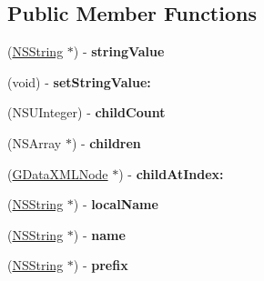 \subsection*{Public Member Functions}
\begin{DoxyCompactItemize}
\item 
\hypertarget{interface_g_data_x_m_l_node_ad6cef8a7c9c6714b8ea42e2620f86866}{
(\hyperlink{class_n_s_string}{NSString} $\ast$) -\/ {\bfseries stringValue}}
\label{interface_g_data_x_m_l_node_ad6cef8a7c9c6714b8ea42e2620f86866}

\item 
\hypertarget{interface_g_data_x_m_l_node_ab3b73dcb1ac9607325552747a3055a1e}{
(void) -\/ {\bfseries setStringValue:}}
\label{interface_g_data_x_m_l_node_ab3b73dcb1ac9607325552747a3055a1e}

\item 
\hypertarget{interface_g_data_x_m_l_node_a8c1ecef5a1827105f8cdb435fe330dda}{
(NSUInteger) -\/ {\bfseries childCount}}
\label{interface_g_data_x_m_l_node_a8c1ecef5a1827105f8cdb435fe330dda}

\item 
\hypertarget{interface_g_data_x_m_l_node_a5d78f07c8cd059176801973bf6883452}{
(NSArray $\ast$) -\/ {\bfseries children}}
\label{interface_g_data_x_m_l_node_a5d78f07c8cd059176801973bf6883452}

\item 
\hypertarget{interface_g_data_x_m_l_node_acabc5e624c3bbc27ba75c443d48b9795}{
(\hyperlink{interface_g_data_x_m_l_node}{GDataXMLNode} $\ast$) -\/ {\bfseries childAtIndex:}}
\label{interface_g_data_x_m_l_node_acabc5e624c3bbc27ba75c443d48b9795}

\item 
\hypertarget{interface_g_data_x_m_l_node_a503afc6b19e456b831f6b45ae184336c}{
(\hyperlink{class_n_s_string}{NSString} $\ast$) -\/ {\bfseries localName}}
\label{interface_g_data_x_m_l_node_a503afc6b19e456b831f6b45ae184336c}

\item 
\hypertarget{interface_g_data_x_m_l_node_a4dcfed52258221c7387f1482d7ee8488}{
(\hyperlink{class_n_s_string}{NSString} $\ast$) -\/ {\bfseries name}}
\label{interface_g_data_x_m_l_node_a4dcfed52258221c7387f1482d7ee8488}

\item 
\hypertarget{interface_g_data_x_m_l_node_ad243c0aec788b95cb5fa8b6a89707c10}{
(\hyperlink{class_n_s_string}{NSString} $\ast$) -\/ {\bfseries prefix}}
\label{interface_g_data_x_m_l_node_ad243c0aec788b95cb5fa8b6a89707c10}


\end{DoxyCompactItemize}

